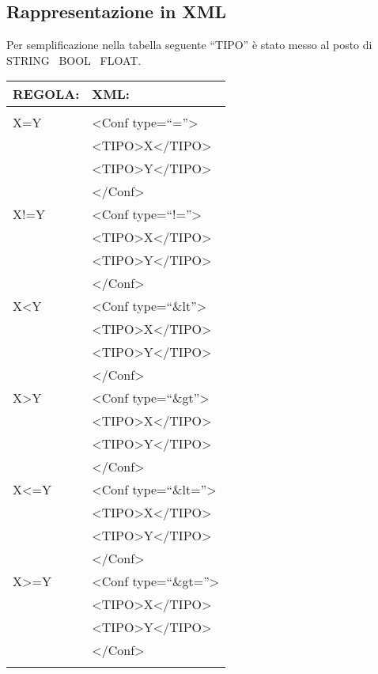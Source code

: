 \subsection{Rappresentazione in XML}
Per semplificazione nella tabella seguente ``TIPO'' \`e stato messo al posto di STRING \textbar\ BOOL \textbar\ FLOAT.
\begin{table}[htbp]
\begin{tabular}{||p{3cm}||p{6.5cm}||}
\hline
\textbf{REGOLA:} & \textbf{XML:} \\ \hline
& \\ \hline
X=Y & \textless Conf type=``=''\textgreater \\
& \textless TIPO\textgreater X\textless /TIPO\textgreater \\
& \textless TIPO\textgreater Y\textless /TIPO\textgreater \\ 
& \textless /Conf\textgreater \\ \hline
X!=Y & \textless Conf type=``!=''\textgreater \\
& \textless TIPO\textgreater X\textless /TIPO\textgreater \\
& \textless TIPO\textgreater Y\textless /TIPO\textgreater \\ 
& \textless /Conf\textgreater\\ \hline
X\textless Y & \textless Conf type=``\&lt''\textgreater \\
& \textless TIPO\textgreater X\textless /TIPO\textgreater \\
& \textless TIPO\textgreater Y\textless /TIPO\textgreater \\ 
& \textless /Conf\textgreater\\ \hline
X\textgreater Y & \textless Conf type=``\&gt''\textgreater \\
& \textless TIPO\textgreater X\textless /TIPO\textgreater \\
& \textless TIPO\textgreater Y\textless /TIPO\textgreater \\ 
& \textless /Conf\textgreater\\ \hline
X\textless=Y & \textless Conf type=``\&lt=''\textgreater \\
& \textless TIPO\textgreater X\textless /TIPO\textgreater \\
& \textless TIPO\textgreater Y\textless /TIPO\textgreater \\ 
& \textless /Conf\textgreater\\ \hline
X\textgreater =Y &  \textless Conf type=``\&gt=''\textgreater \\
& \textless TIPO\textgreater X\textless /TIPO\textgreater \\
& \textless TIPO\textgreater Y\textless /TIPO\textgreater \\ 
& \textless /Conf\textgreater\\ \hline
& \\ \hline
\end{tabular} \\
\end{table}

